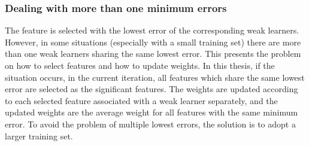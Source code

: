 \subsubsection{Dealing with more than one minimum errors}
The feature is selected with the lowest error of the corresponding weak learners. However, in some situations (especially with a small training set) there are more than one weak learners sharing the same lowest error. This presents the problem on how to select features and how to update weights. In this thesis, if the situation occurs, in the current iteration, all features which share the same lowest error are selected as the significant features. The weights are updated according to each selected feature associated with a weak learner separately, and the updated weights are the average weight for all features with the same minimum error. To avoid the problem of multiple lowest errors, the solution is to adopt a larger training set.

